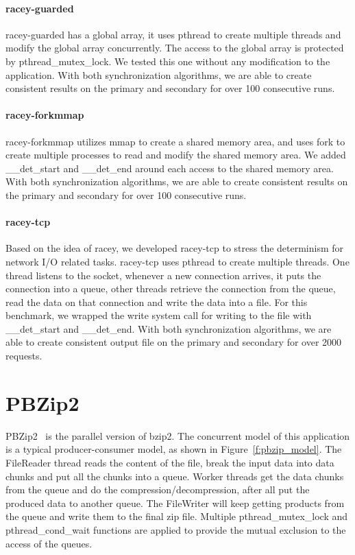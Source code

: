 \paragraph{racey-guarded} racey-guarded has a global array, it uses pthread to create multiple threads and modify the global array concurrently. The access to the global array is protected by pthread\_mutex\_lock. We tested this one without any modification to the application. With both synchronization algorithms, we are able to create consistent results on the primary and secondary for over 100 consecutive runs.

\paragraph{racey-forkmmap} racey-forkmmap utilizes mmap to create a shared memory area, and uses fork to create multiple processes to read and modify the shared memory area. We 	added \_\_det\_start and \_\_det\_end around each access to the shared memory area. With both synchronization algorithms, we are able to create consistent results on the primary and secondary for over 100 consecutive runs.

\paragraph{racey-tcp} Based on the idea of racey, we developed racey-tcp to stress the determinism for network I/O related tasks. racey-tcp uses pthread to create multiple threads. One thread listens to the socket, whenever a new connection arrives, it puts the connection into a queue, other threads retrieve the connection from the queue, read the data on that connection and write the data into a file. For this benchmark, we wrapped the write system call for writing to the file with \_\_det\_start and \_\_det\_end. With both synchronization algorithms, we are able to create consistent output file on the primary and secondary for over 2000 requests.

\section{PBZip2} \label{sec:pbzip2}
PBZip2~\cite{gilchristparallel} is the parallel version of bzip2. The concurrent model of this application is a typical producer-consumer model, as shown in Figure~\ref{f:pbzip_model}. The FileReader thread reads the content of the file, break the input data into data chunks and put all the chunks into a queue. Worker threads get the data chunks from the queue and do the compression/decompression, after all put the produced data to another queue. The FileWriter will keep getting products from the queue and write them to the final zip file. Multiple pthread\_mutex\_lock and pthread\_cond\_wait functions are applied to provide the mutual exclusion to the access of the queues.

